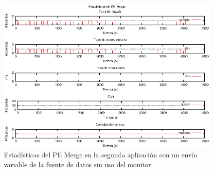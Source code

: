 \begin{figure}[p]
\centering
    \includegraphics[scale=1.1]{images/exp/app2/normal/sm/statusMergePE.eps}
    \caption{Estadísticas del PE Merge en la segunda aplicación con un envío variable de la fuente de datos sin uso del monitor.}
    \label{fig:app2-normal-statusMergePE-sm}
\end{figure}


